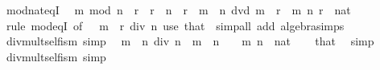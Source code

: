 \begin{isabellebody}
\endisatagproof
{\isafoldproof}%
%
\isadelimproof
\isanewline
%
\endisadelimproof
\isanewline
{}\isamarkupfalse%
\ mod{\isacharunderscore}{\kern0pt}nat{\isacharunderscore}{\kern0pt}eqI{\isacharcolon}{\kern0pt}\isanewline
\ \ {\isachardoublequoteopen}m\ mod\ n\ {\isacharequal}{\kern0pt}\ r{\isachardoublequoteclose}\ \ {\isachardoublequoteopen}r\ {\isacharless}{\kern0pt}\ n{\isachardoublequoteclose}\ \ {\isachardoublequoteopen}r\ {\isasymle}\ m{\isachardoublequoteclose}\ \ {\isachardoublequoteopen}n\ dvd\ m\ {\isacharminus}{\kern0pt}\ r{\isachardoublequoteclose}\ \ m\ n\ r\ {\isacharcolon}{\kern0pt}{\isacharcolon}{\kern0pt}\ nat\isanewline
%
\isadelimproof
\ \ %
\endisadelimproof
%
\isatagproof
{}\isamarkupfalse%
\ {\isacharparenleft}{\kern0pt}rule\ mod{\isacharunderscore}{\kern0pt}eqI\ {\isacharbrackleft}{\kern0pt}of\ {\isacharunderscore}{\kern0pt}\ {\isacharunderscore}{\kern0pt}\ {\isachardoublequoteopen}{\isacharparenleft}{\kern0pt}m\ {\isacharminus}{\kern0pt}\ r{\isacharparenright}{\kern0pt}\ div\ n{\isachardoublequoteclose}{\isacharbrackright}{\kern0pt}{\isacharparenright}{\kern0pt}\ {\isacharparenleft}{\kern0pt}use\ that\ \ {\isacartoucheopen}simp{\isacharunderscore}{\kern0pt}all\ add{\isacharcolon}{\kern0pt}\ algebra{\isacharunderscore}{\kern0pt}simps{\isacartoucheclose}{\isacharparenright}{\kern0pt}%
\endisatagproof
{\isafoldproof}%
%
\isadelimproof
\isanewline
%
\endisadelimproof
\isanewline
{}\isamarkupfalse%
\ div{\isacharunderscore}{\kern0pt}mult{\isacharunderscore}{\kern0pt}self{\isacharunderscore}{\kern0pt}is{\isacharunderscore}{\kern0pt}m\ {\isacharbrackleft}{\kern0pt}simp{\isacharbrackright}{\kern0pt}{\isacharcolon}{\kern0pt}\isanewline
\ \ {\isachardoublequoteopen}m\ {\isacharasterisk}{\kern0pt}\ n\ div\ n\ {\isacharequal}{\kern0pt}\ m{\isachardoublequoteclose}\ \ {\isachardoublequoteopen}n\ {\isachargreater}{\kern0pt}\ {}{\isachardoublequoteclose}\ \ m\ n\ {\isacharcolon}{\kern0pt}{\isacharcolon}{\kern0pt}\ nat\isanewline
%
\isadelimproof
\ \ %
\endisadelimproof
%
\isatagproof
{}\isamarkupfalse%
\ that\ \isamarkupfalse%
\ simp%
\endisatagproof
{\isafoldproof}%
%
\isadelimproof
\isanewline
%
\endisadelimproof
\isanewline
{}\isamarkupfalse%
\ div{\isacharunderscore}{\kern0pt}mult{\isacharunderscore}{\kern0pt}self{}{\isacharunderscore}{\kern0pt}is{\isacharunderscore}{\kern0pt}m\ {\isacharbrackleft}{\kern0pt}simp{\isacharbrackright}{\kern0pt}{\isacharcolon}{\kern0pt}\isanewline

\end{isabellebody}
